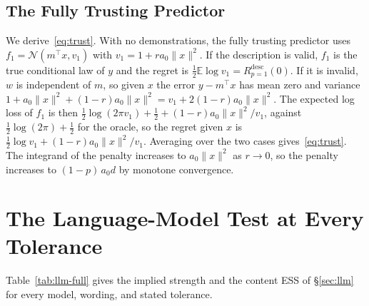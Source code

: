 \documentclass[10pt]{article}
\newcommand{\E}{\mathbb{E}}
\begin{document}
\subsection{The Fully Trusting Predictor}\label{app:trust}
We derive~\eqref{eq:trust}. With no demonstrations, the fully trusting predictor uses $f_1 = \mathcal{N}(m^\top x, v_1)$ with $v_1 = 1 + r a_0 \|x\|^2$. If the description is valid, $f_1$ is the true conditional law of $y$ and the regret is $\tfrac12 \E \log v_1 = R^{\mathrm{desc}}_{p=1}(0)$. If it is invalid, $w$ is independent of $m$, so given $x$ the error $y - m^\top x$ has mean zero and variance $1 + a_0\|x\|^2 + (1-r)a_0\|x\|^2 = v_1 + 2(1-r)a_0\|x\|^2$. The expected log loss of $f_1$ is then $\tfrac12 \log(2\pi v_1) + \tfrac12 + (1-r)a_0\|x\|^2/v_1$, against $\tfrac12 \log(2\pi) + \tfrac12$ for the oracle, so the regret given $x$ is $\tfrac12 \log v_1 + (1-r)a_0\|x\|^2/v_1$. Averaging over the two cases gives~\eqref{eq:trust}. The integrand of the penalty increases to $a_0\|x\|^2$ as $r \to 0$, so the penalty increases to $(1-p)\,a_0 d$ by monotone convergence.

\section{The Language-Model Test at Every Tolerance}\label{app:llm}
Table~\ref{tab:llm-full} gives the implied strength and the content ESS of \S\ref{sec:llm} for every model, wording, and stated tolerance.

\begin{table}[t]
\centering\small
\setlength{\tabcolsep}{4pt}
\caption{Implied strength of a valid and an invalid line, and content ESS of a valid line over the number tokens and with the full next-token loss, for every model, wording, and stated tolerance ($2{,}000$ tasks, $n = 5, \dots, 10$). The Bayes-optimal rows are the predictor that takes the line as valid and the predictor that hedges with a prior probability of validity $p$.}
\label{tab:llm-full}
\vspace{3pt}

\end{table}
\end{document}
